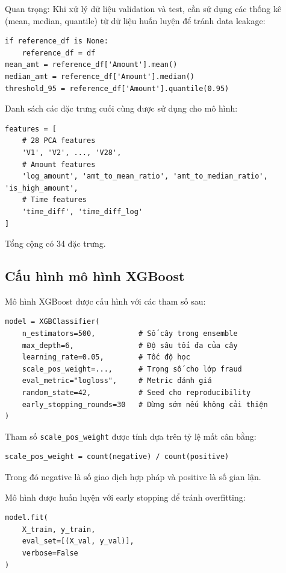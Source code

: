 Quan trọng: Khi xử lý dữ liệu validation và test, cần sử dụng các thống kê (mean, median, quantile) từ dữ liệu huấn luyện để tránh data leakage:

\begin{verbatim}
if reference_df is None:
    reference_df = df
mean_amt = reference_df['Amount'].mean()
median_amt = reference_df['Amount'].median()
threshold_95 = reference_df['Amount'].quantile(0.95)
\end{verbatim}

Danh sách các đặc trưng cuối cùng được sử dụng cho mô hình:

\begin{verbatim}
features = [
    # 28 PCA features
    'V1', 'V2', ..., 'V28',
    # Amount features
    'log_amount', 'amt_to_mean_ratio', 'amt_to_median_ratio', 'is_high_amount',
    # Time features
    'time_diff', 'time_diff_log'
]
\end{verbatim}

Tổng cộng có 34 đặc trưng.

\subsection{Cấu hình mô hình XGBoost}

Mô hình XGBoost được cấu hình với các tham số sau:

\begin{verbatim}
model = XGBClassifier(
    n_estimators=500,          # Số cây trong ensemble
    max_depth=6,               # Độ sâu tối đa của cây
    learning_rate=0.05,        # Tốc độ học
    scale_pos_weight=...,      # Trọng số cho lớp fraud
    eval_metric="logloss",     # Metric đánh giá
    random_state=42,           # Seed cho reproducibility
    early_stopping_rounds=30   # Dừng sớm nếu không cải thiện
)
\end{verbatim}

Tham số \texttt{scale\_pos\_weight} được tính dựa trên tỷ lệ mất cân bằng:

\begin{verbatim}
scale_pos_weight = count(negative) / count(positive)
\end{verbatim}

Trong đó negative là số giao dịch hợp pháp và positive là số gian lận.

Mô hình được huấn luyện với early stopping để tránh overfitting:

\begin{verbatim}
model.fit(
    X_train, y_train,
    eval_set=[(X_val, y_val)],
    verbose=False
)
\end{verbatim}


